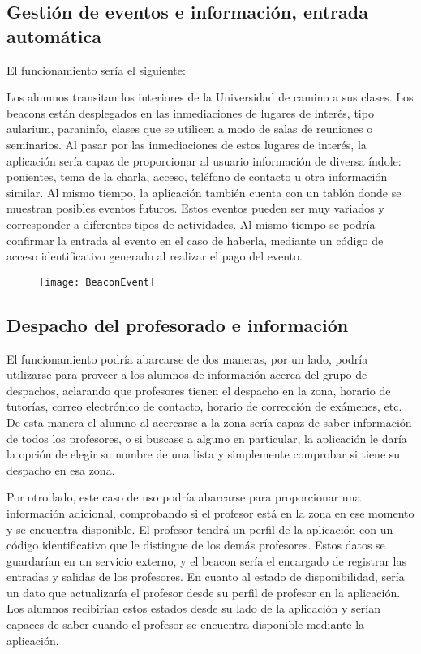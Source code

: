 \subsection{Gestión de eventos e información, entrada automática}

El funcionamiento sería el siguiente: 


Los alumnos transitan los interiores de la Universidad de camino a sus clases. Los beacons están desplegados en las inmediaciones de lugares de interés, tipo aularium, paraninfo, clases que se utilicen a modo de salas de reuniones o seminarios. Al pasar por las inmediaciones de estos lugares de interés, la aplicación sería capaz de proporcionar al usuario información de diversa índole: ponientes, tema de la charla, acceso, teléfono de contacto u otra información similar.  Al mismo tiempo, la aplicación también cuenta con un tablón donde se muestran posibles eventos futuros. Estos eventos pueden ser muy variados y corresponder a diferentes tipos de actividades. Al mismo tiempo se podría confirmar la entrada al evento en el caso de haberla, mediante un código de acceso identificativo generado al realizar el pago del evento.

\begin{figure}[H]
	\centering
	\texttt{[image: BeaconEvent]}
	\label{fig:eventBeacon}
\end{figure}

\subsection{Despacho del profesorado e información}

El funcionamiento podría abarcarse de dos maneras, por un lado, podría utilizarse para proveer a los alumnos de información acerca del grupo de despachos, aclarando que profesores tienen el despacho en la zona, horario de tutorías, correo electrónico de contacto, horario de corrección de exámenes, etc. De esta manera el alumno al acercarse a la zona sería capaz de saber información de todos los profesores, o si buscase a alguno en particular, la aplicación le daría la opción de elegir su nombre de una lista y simplemente comprobar si tiene su despacho en esa zona. 

Por otro lado, este caso de uso podría abarcarse para proporcionar una información adicional, comprobando si el profesor está en la zona en ese momento y se encuentra disponible. El profesor tendrá un perfil de la aplicación con un código identificativo que le distingue de los demás profesores. Estos datos se guardarían en un servicio externo, y el beacon sería el encargado de registrar las entradas y salidas de los profesores. En cuanto al estado de disponibilidad, sería un dato que actualizaría el profesor desde su perfil de profesor en la aplicación. Los alumnos recibirían estos estados desde su lado de la aplicación y serían capaces de saber cuando el profesor se encuentra disponible mediante la aplicación. 

